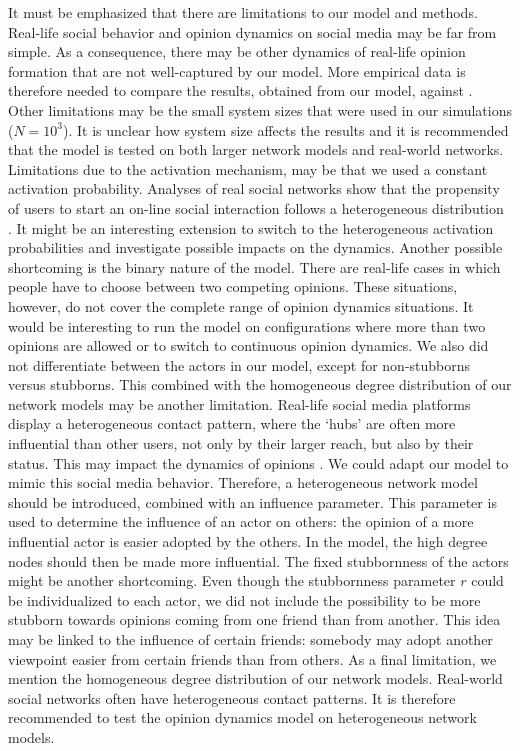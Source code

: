 \documentclass[11 pt , letterpaper , twoside , openright]{book}
\begin{document}
It must be emphasized that there are limitations to our model and methods. Real-life social behavior and opinion dynamics on social media may be far from simple. As a consequence, there may be other dynamics of real-life opinion formation that are not well-captured by our model. More empirical data is therefore needed to compare the results, obtained from our model, against \cite{Castellano2009}\cite{Pawel}. Other limitations may be the small system sizes that were used in our simulations ($N = 10^3$). It is unclear how system size affects the results and it is recommended that the model is tested on both larger network models and real-world networks. Limitations due to the activation mechanism, may be that we used a constant activation probability. Analyses of real social networks show that the propensity of users to start an on-line social interaction follows a heterogeneous distribution \cite{Perra2012}\cite{Perra2019}. It might be an interesting extension to switch to the heterogeneous activation probabilities and investigate possible impacts on the dynamics. Another possible shortcoming is the binary nature of the model. There are real-life cases in which people have to choose between two competing opinions. These situations, however, do not cover the complete range of opinion dynamics situations. It would be interesting to run the model on configurations where more than two opinions are allowed or to switch to continuous opinion dynamics. We also did not differentiate between the actors in our model, except for non-stubborns versus stubborns. This combined with the homogeneous degree distribution of our network models may be another limitation. Real-life social media platforms display a heterogeneous contact pattern, where the `hubs' are often more influential than other users, not only by their larger reach, but also by their status. This may impact the dynamics of opinions \cite{Fan2020}\cite{Wang2019}. We could adapt our model to mimic this social media behavior. Therefore, a heterogeneous network model should be introduced, combined with an influence parameter. This parameter is used to determine the influence of an actor on others: the opinion of a more influential actor is easier adopted by the others. In the model, the high degree nodes should then be made more influential. The fixed stubbornness of the actors might be another shortcoming. Even though the stubbornness parameter $r$ could be individualized to each actor, we did not include the possibility to be more stubborn towards opinions coming from one friend than from another. This idea may be linked to the influence of certain friends: somebody may adopt another viewpoint easier from certain friends than from others. As a final limitation, we mention the homogeneous degree distribution of our network models. Real-world social networks often have heterogeneous contact patterns. It is therefore recommended to test the opinion dynamics model on heterogeneous network models.\\
\end{document}
